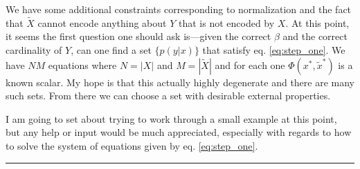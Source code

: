 \documentclass{article}
\newcommand{\lp}{\left(}
\newcommand{\rp}{\right)}
\newcommand{\xtilde}{\tilde{x}}
\newcommand{\Xtilde}{\tilde{X}}
\newcommand{\B}{\beta}
\newcommand{\pyx}{p\lp y | x \rp}
\begin{document}
We have some additional constraints corresponding to normalization and the fact that $\Xtilde$ cannot encode anything about $Y$ that is not encoded by $X$.  At this point, it seems the first question one should ask is---given the correct $\B$ and the correct cardinality of $Y$, can one find a set $\{\pyx\}$ that satisfy eq. \ref{eq:step_one}.  We have $NM$ equations where $N = |X|$ and $M = |\Xtilde|$ and for each one $\Phi(x^*,\xtilde^*)$ is a known scalar.  My hope is that this actually highly degenerate and there are many such sets.  From there we can choose a set with desirable external properties.

I am going to set about trying to work through a small example at this point, but any help or input would be much appreciated, especially with regards to how to solve the system of equations given by eq. \ref{eq:step_one}.

\vspace{10pt}
\hrule

\vspace{15pt}
\end{document}
